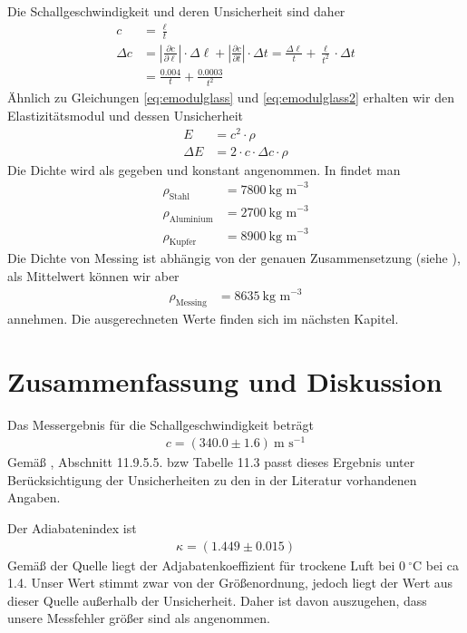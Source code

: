 \documentclass{article}
\begin{document}
Die Schallgeschwindigkeit und deren Unsicherheit sind daher
\begin{align}
c &= \frac{\ell}{t} \\
\Delta c &= \left| \frac{\partial c}{\partial\ell}\right| \cdot \Delta \ell + \left|\frac{\partial c}{\partial t}\right| \cdot \Delta t = \frac{\Delta \ell}{t} + \frac{\ell}{t^2}\cdot \Delta t \\
&= \frac{0.004}{t} + \frac{0.0003}{t^2}
\end{align}
Ähnlich zu Gleichungen \eqref{eq:emodulglass} und  \eqref{eq:emodulglass2} erhalten wir den Elastizitätsmodul und dessen Unsicherheit 
\begin{align}
E &= c^2\cdot \rho \\
\Delta E &= 2\cdot c\cdot \Delta c\cdot \rho
\end{align}
Die Dichte wird als gegeben und konstant angenommen. In \cite{giancoli} findet man
\begin{align}
\rho_\text{Stahl} &= 7800~\text{kg~m}^{-3} \\
\rho_\text{Aluminium} &= 2700~\text{kg~m}^{-3} 
\\
\rho_\text{Kupfer} &= 8900~\text{kg~m}^{-3} 
\end{align}
Die Dichte von Messing ist abhängig von der genauen Zusammensetzung (siehe \cite{messing}), als Mittelwert können wir aber 
\begin{align}
\rho_\text{Messing} &= 8635~\text{kg~m}^{-3} 
\end{align}
annehmen. Die ausgerechneten Werte finden sich im nächsten Kapitel.


\section{Zusammenfassung und Diskussion}


Das Messergebnis für die Schallgeschwindigkeit beträgt
\begin{align*}
c = (340.0 \pm 1.6)~\text{m s}^{-1}
\end{align*}
Gemäß \cite{demtr1}, Abschnitt 11.9.5.5. bzw Tabelle 11.3 passt dieses Ergebnis unter Berücksichtigung der Unsicherheiten zu den in der Literatur vorhandenen Angaben.

Der Adiabatenindex ist
\begin{align*}
\kappa = (1.449 \pm 0.015)
\end{align*}
Gemäß der Quelle \cite{exponent} liegt der Adjabatenkoeffizient für trockene Luft bei $0~^\circ$C bei ca 1.4. Unser Wert stimmt zwar von der Größenordnung, jedoch liegt der Wert aus dieser Quelle außerhalb der Unsicherheit. Daher ist davon auszugehen, dass unsere Messfehler größer sind als angenommen.
\end{document}
